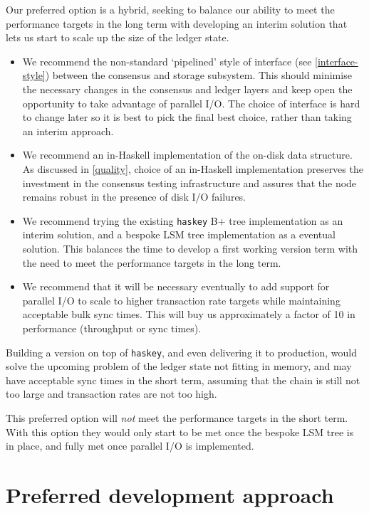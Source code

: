 \documentclass[11pt,a4paper]{article}
\begin{document}
Our preferred option is a hybrid, seeking to balance our ability to meet the
performance targets in the long term with developing an interim solution that
lets us start to scale up the size of the ledger state.
\begin{itemize}
\item We recommend the non-standard `pipelined' style of interface (see
      \cref{interface-style}) between the consensus and storage subsystem.
      This should minimise the necessary changes in the consensus and ledger
      layers and keep open the opportunity to take advantage of parallel I/O.
      The choice of interface is hard to change later so it is best to pick the
      final best choice, rather than taking an interim approach.

\item We recommend an in-Haskell implementation of the on-disk data structure.
      As discussed in \cref{quality}, choice of an in-Haskell implementation
      preserves the investment in the consensus testing infrastructure and
      assures that the node remains robust in the presence of disk I/O failures.

\item We recommend trying the existing {\tt haskey} B+ tree implementation as
      an interim solution, and a bespoke LSM tree implementation as a eventual
      solution. This balances the time to develop a first working version term
      with the need to meet the performance targets in the long term.

\item We recommend that it will be necessary eventually to add support for
      parallel I/O to scale to higher transaction rate targets while
      maintaining acceptable bulk sync times. This will buy us approximately a
      factor of 10 in performance (throughput or sync times).
\end{itemize}

Building a version on top of {\tt haskey}, and even delivering it to production,
would solve the upcoming problem of the ledger state not fitting in memory,
and may have acceptable sync times in the short term, assuming that the chain
is still not too large and transaction rates are not too high.

This preferred option will \emph{not} meet the performance targets in the short
term. With this option they would only start to be met once the bespoke LSM
tree is in place, and fully met once parallel I/O is implemented.


\section{Preferred development approach}
\end{document}
